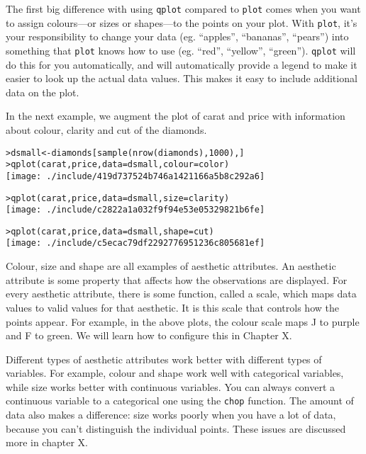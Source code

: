 The first big difference with using {\tt qplot} compared to {\tt plot} comes when you want to assign colours---or sizes or shapes---to the points on your plot.  With {\tt plot}, it's your responsibility to change your data (eg. ``apples'', ``bananas'', ``pears'') into something that {\tt plot} knows how to use (eg. ``red'', ``yellow'', ``green'').  {\tt qplot} will do this for you automatically, and will automatically provide a legend to make it easier to look up the actual data values.  This makes it easy to include additional data on the plot.  

In the next example, we augment the plot of carat and price with information about colour, clarity and cut of the diamonds.

\begin{alltt}
> dsmall <- diamonds[sample(nrow(diamonds), 1000), ]
> qplot(carat, price, data = dsmall, colour = color)
\texttt{[image: ./include/419d737524b746a1421166a5b8c292a6]}

> qplot(carat, price, data = dsmall, size = clarity)
\texttt{[image: ./include/c2822a1a032f9f94e53e05329821b6fe]}

> qplot(carat, price, data = dsmall, shape = cut)
\texttt{[image: ./include/c5ecac79df2292776951236c805681ef]}

\end{alltt}

Colour, size and shape are all examples of aesthetic attributes.  An aesthetic attribute is some property that affects how the observations are displayed.  For every aesthetic attribute, there is some function, called a scale, which maps data values to valid values for that aesthetic.  It is this scale that controls how the points appear.  For example, in the above plots, the colour scale maps J to purple and F to green.  We will learn how to configure this in Chapter X.

Different types of aesthetic attributes work better with different types of variables.  For example, colour and shape work well with categorical variables, while size works better with continuous variables.  You can always convert a continuous variable to a categorical one using the {\tt chop} function. The amount of data also makes a difference:  size works poorly when you have a lot of data, because you can't distinguish the individual points.  These issues are discussed more in chapter X.

